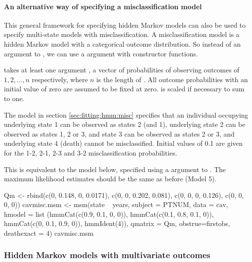 \paragraph{An alternative way of specifying a misclassification model}

This general framework for specifying hidden Markov models can also be
used to specify multi-state models with misclassification.  A
misclassification model is a hidden Markov model with a categorical
outcome distribution.  So instead of an  argument to
, we can use a  argument with
 constructor functions.

 takes at least one argument , a
vector of probabilities of observing outcomes of $1, 2, \ldots, n$
respectively, where $n$ is the length of .  All outcome
probabilities with an initial value of zero are assumed to be fixed at
zero.   is scaled if necessary to sum to one.

The model in section \ref{sec:fitting:hmm:misc} specifies that an
individual occupying underlying state 1 can be observed as states 2
(and 1), underlying state 2 can be observed as states 1, 2 or 3, and
state 3 can be observed as states 2 or 3, and underlying state 4
(death) cannot be misclassified. Initial values of 0.1 are given for
the 1-2, 2-1, 2-3 and 3-2 misclassification probabilities.

This is equivalent to the model below, specified using a
 argument to .  The maximum likelihood
estimates should be the same as before (Model 5).

\begin{Scode}
Qm <- rbind(c(0, 0.148, 0, 0.0171),
            c(0, 0, 0.202, 0.081),
            c(0, 0, 0, 0.126),
            c(0, 0, 0, 0))
cavmisc.msm <- msm(state ~ years, subject = PTNUM, data = cav,
                     hmodel = list (hmmCat(c(0.9, 0.1, 0, 0)),
                                    hmmCat(c(0.1, 0.8, 0.1, 0)),
                                    hmmCat(c(0, 0.1, 0.9, 0)),
                                    hmmIdent(4)),
                     qmatrix = Qm, obstrue=firstobs, deathexact = 4)
cavmisc.msm
\end{Scode}


\subsubsection{Hidden Markov models with multivariate outcomes}

